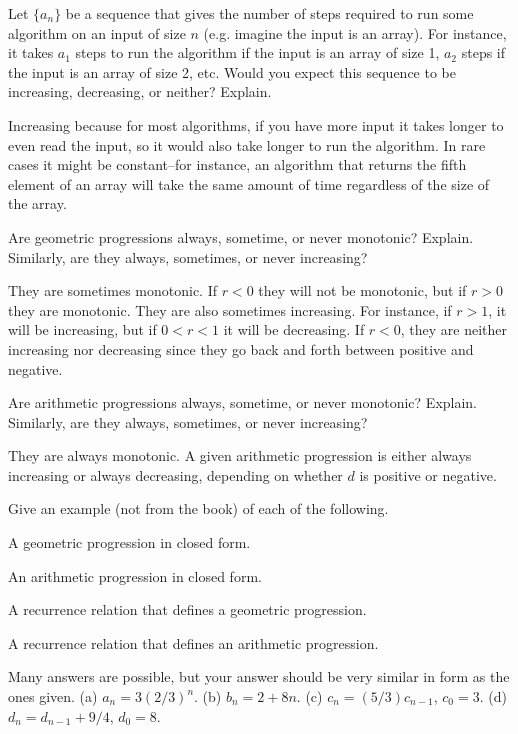 \begin{requ}
Let $\{a_n\}$ be a sequence that gives the number of steps required to run some algorithm on an input of size $n$
(e.g. imagine the input is an array).
For instance, it takes $a_1$ steps to run the algorithm if the input is an array of size 1, 
$a_2$ steps if the input is an array of size 2, etc. 
Would you expect this sequence to be increasing, decreasing, or neither? Explain.
\begin{requanswer}
Increasing because for most algorithms, if you have more input it takes longer to even read the input, so it
would also take longer to run the algorithm. In rare cases it might be constant--for instance, an algorithm that
returns the fifth element of an array will take the same amount of time regardless of the size of the array.
\end{requanswer}
\end{requ}

\begin{requ}
Are geometric progressions always, sometime, or never monotonic? Explain.
Similarly, are they always, sometimes, or never increasing?
\begin{requanswer}
They are sometimes monotonic. If $r<0$ they will not be monotonic, but if $r>0$ they are monotonic.
They are also sometimes increasing. For instance, if $r>1$, it will be increasing, but if
$0<r<1$ it will be decreasing. If $r<0$, they are neither increasing nor decreasing since they
go back and forth between positive and negative.
\end{requanswer}
\end{requ}

\begin{requ}
Are arithmetic progressions always, sometime, or never monotonic? Explain.
Similarly, are they always, sometimes, or never increasing?
\begin{requanswer}
They are always monotonic. A given arithmetic progression is either always increasing or always decreasing,
depending on whether $d$ is positive or negative.
\end{requanswer}
\end{requ}

\begin{requ}
Give an example (not from the book) of each of the following.
\begin{lenum}
\item A geometric progression in closed form. 
\item An arithmetic progression in closed form.
\item A recurrence relation that defines a geometric progression.
\item A recurrence relation that defines an arithmetic progression.
\end{lenum}
\begin{requanswer}
Many answers are possible, but your answer should be very similar in form as the ones given.
(a) $a_n=3(2/3)^n$.
(b) $b_n=2+8n$.
(c) $c_n=(5/3)c_{n-1}$, $c_0=3$.
(d) $d_n=d_{n-1}+9/4$, $d_0=8$.
\end{requanswer}
\end{requ}

